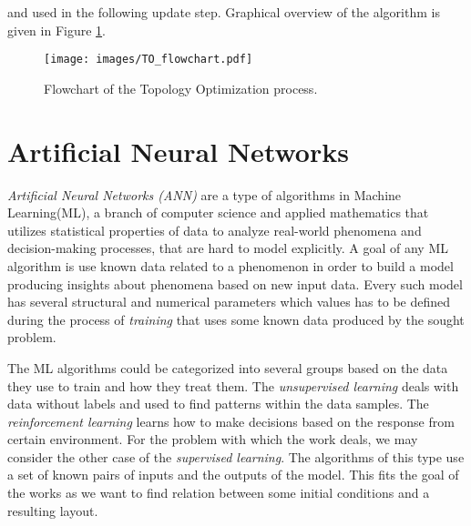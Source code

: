 and used in the following update step.
Graphical overview of the algorithm is given in Figure \ref{fig:to_flow}.

\begin{figure}[h]
	\centering
	\texttt{[image: images/TO\_flowchart.pdf]}
	\caption{Flowchart of the Topology Optimization process.}
	\label{fig:to_flow}
\end{figure}



\chapter{Artificial Neural Networks}

\emph{Artificial Neural Networks (ANN)} are a type of algorithms in Machine Learning(ML), a branch of computer science and applied mathematics that utilizes statistical properties of data to analyze real-world phenomena and decision-making processes, that are hard to model explicitly. 
A goal of any ML algorithm is use known data related to a phenomenon in order to build a model producing insights about phenomena based on new input data. 
Every such model has several structural and numerical parameters which values has to be defined during the process of \emph{training} that uses some known data produced by the sought problem.
\medskip

The ML algorithms could be categorized into several groups based on the data they use to train and how they treat them.
The \emph{unsupervised learning} deals with data without labels and used to find patterns within the data samples.
The \emph{reinforcement learning} learns how to make decisions based on the response from certain environment.
For the problem with which the work deals, we may consider the other case of the \emph{supervised learning}.
The algorithms of this type use a set of known pairs of inputs and the outputs of the model.
This fits the goal of the works as we want to find relation between some initial conditions and a resulting layout.
\medskip

